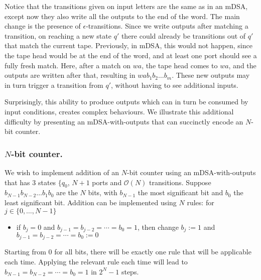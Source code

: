 Notice that the transitions given on input letters are the same as in an mDSA, except now they also write all the outputs to the end of the word. The main change is the presence of $\epsilon$-transitions. Since we write outputs after matching a transition, on reaching a new state $q'$ there could already be transitions out of $q'$ that match the current tape. Previously, in mDSA, this would not happen, since the tape head would be at the end of the word, and at least one port should see a fully fresh match. Here, after a match on $wa$, the tape head comes to $wa$, and the outputs are written after that, resulting in $wa b_1 b_2 \dots b_m$. These new outputs may in turn trigger a transition from $q'$, without having to see additional inputs.

Surprisingly, this ability to produce outputs which can in turn be consumed by input conditions, creates complex behaviours.  We illustrate this additional difficulty by presenting an mDSA-with-outputs that can succinctly encode an $N$-bit counter.

\subsubsection*{$N$-bit counter.} We wish to implement addition of an $N$-bit counter using an mDSA-with-outputs that has $3$ states $\{q_0$, $N+1$ ports and $\mathcal{O}(N)$ transitions. Suppose $b_{N-1} b_{N-2} \dots b_1 b_0$ are the $N$ bits, with $b_{N-1}$ the most significant bit and $b_0$ the least significant bit. Addition can be implemented using $N$ rules: for $j \in \{0, \dots, N-1\}$
\begin{itemize}
\item if $b_j = 0$ and $b_{j-1} = b_{j-2} = \cdots = b_0 = 1$, then change $b_j:= 1$ and $b_{j-1} = b_{j-2} = \cdots = b_0 := 0$
\end{itemize}
Starting from $0$ for all bits, there will be exactly one rule that will be applicable each time. Applying the relevant rule each time will lead to $b_{N-1} = b_{N-2} = \cdots = b_0 = 1$ in $2^N - 1$ steps.

